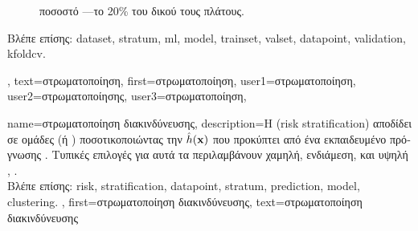 {{\begin{figure}[H]
{{{			ποσοστό} —\foreignlanguage{greek}{το 20\% του δικού τους πλάτους}. \label{fig_stratification_dict}} }
 		\end{figure}
  		\foreignlanguage{greek}{Βλέπε επίσης:} \gls{dataset}, \gls{stratum}, \gls{ml}, \gls{model}, \gls{trainset}, \gls{valset}, \gls{datapoint}, 
		\gls{validation}, \gls{kfoldcv}. },
  	text={\foreignlanguage{greek}{στρωματοποίηση}},
  	first={\foreignlanguage{greek}{στρωματοποίηση}},
	user1={\foreignlanguage{greek}{στρωματοποίηση}}, %
	user2={\foreignlanguage{greek}{στρωματοποίησης}}, %
	user3={\foreignlanguage{greek}{στρωματοποίηση}}, %
}

{name={\foreignlanguage{greek}{στρωματοποίηση διακινδύνευσης}},
	description={\foreignlanguage{greek}{Η}  
		\linebreak (risk stratification) \foreignlanguage{greek}{αποδίδει}  \foreignlanguage{greek}{σε ομάδες} 
		 \foreignlanguage{greek}{(ή} ) \foreignlanguage{greek}{ποσοτικοποιώντας την}  
		$\hat{h}({\bf x})$ \foreignlanguage{greek}{που προκύπτει από ένα εκπαιδευμένο}  
		\foreignlanguage{greek}{πρόγνωσης} . \foreignlanguage{greek}{Τυπικές επιλογές για αυτά τα}  
		\foreignlanguage{greek}{περιλαμβάνουν χαμηλή, ενδιάμεση, και υψηλή}  \cite{Collins:2012aa}, \cite{Steyerberg2019}. 
		\\
		\foreignlanguage{greek}{Βλέπε επίσης:} \gls{risk}, \gls{stratification}, \gls{datapoint}, \gls{stratum}, \gls{prediction}, \gls{model}, \gls{clustering}. },
	first={\foreignlanguage{greek}{στρωματοποίηση διακινδύνευσης}},
	text={\foreignlanguage{greek}{στρωματοποίηση διακινδύνευσης}}
}


